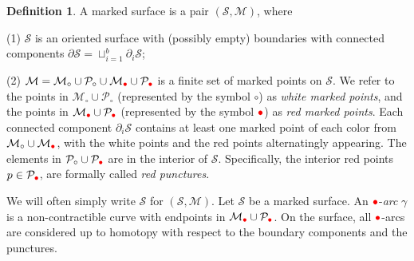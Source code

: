 \documentclass[11pt]{amsart}
\numberwithin{equation}{section}
\theoremstyle{definition}
\newtheorem{definition}[theorem]{Definition}
\newcommand{\rpoint}{\color{red}{\bullet}}
\begin{document}
\begin{definition}\label{def:marked_surface}
A marked surface is a pair $(\mathcal{S}, \mathcal{M})$, where

(1) $\mathcal{S}$ is an oriented surface with (possibly empty) boundaries with connected components $\partial\mathcal{S}=\sqcup_{i=1}^{b}\partial_{i}\mathcal{S}$;

(2) $\mathcal{M}=\mathcal{M}_{\circ}\cup\mathcal{P}_{\circ}\cup\mathcal{M}_{\rpoint}\cup\mathcal{P}_{\rpoint}$ is a finite set of marked points on $\mathcal{S}$. We refer to the points in $\mathcal{M}_{\circ}\cup\mathcal{P}_{\circ}$ (represented by the symbol $\circ$) as \emph{white marked points}, and the points in $\mathcal{M}_{\rpoint}\cup\mathcal{P}_{\rpoint}$ (represented by the symbol $\rpoint$) as \emph{red marked points}. Each connected component $\partial_{i}\mathcal{S}$ contains at least one marked point of each color from $\mathcal{M}_{\circ}\cup\mathcal{M}_{\rpoint}$, with the white points and the red points alternatingly appearing. The elements in $\mathcal{P}_{\circ}\cup\mathcal{P}_{\rpoint}$ are in the interior of $\mathcal{S}$. Specifically, the interior red points $p \in \mathcal{P}_{\rpoint}$, are formally called \textit{red punctures}.
\end{definition}

We will often simply write $\mathcal{S}$ for $(\mathcal{S},\mathcal{M})$. Let $\mathcal{S}$ be a marked surface. An $\rpoint$-\textit{arc} $\gamma$ is a non-contractible curve with endpoints in $\mathcal{M}_{\rpoint}\cup\mathcal{P}_{\rpoint}$.
On the surface, all $\rpoint$-arcs are considered up to homotopy with respect to the boundary components and the punctures.
\end{document}
